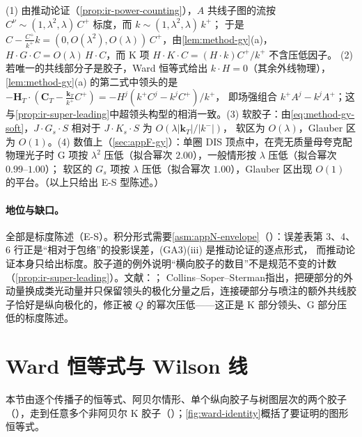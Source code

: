 \begin{proofsketch}
(1) 由推动论证（\cref{prop:ir-power-counting}），$A$ 共线子图的流按 $C^\nu\sim(1,\lambda^2,\lambda)\,C^+$ 标度，而 $k\sim(1,\lambda^2,\lambda)\,k^+$；
于是 $C-\frac{C^+}{k^+}k=(0,O(\lambda^2),O(\lambda))\,C^+$，由\cref{lem:method-gy}(a)，$H\cdot G\cdot C=O(\lambda)\,H\cdot C$，而 K 项 $H\cdot K\cdot C=(H\cdot k)C^+/k^+$ 不含压低因子。
(2) 若唯一的共线部分子是胶子，Ward 恒等式给出 $k\cdot H=0$（其余外线物理），\cref{lem:method-gy}(a) 的第二式中领头的是 $-\mathbf H_T\cdot(\mathbf C_T-\frac{\mathbf k_T}{k^+}C^+)=-H^j(k^+C^j-k^jC^+)/k^+$，
即场强组合 $k^+A^j-k^jA^+$；这与\cref{prop:ir-super-leading}中超领头构型的相消一致。(3) 软胶子：由\cref{eq:method-gy-soft}，$J\cdot G_s\cdot S$ 相对于 $J\cdot K_s\cdot S$ 为 $O(\lambda|\mathbf k_T|/|k^-|)$，
软区为 $O(\lambda)$，Glauber 区为 $O(1)$。(4) 数值上（\cref{sec:appF-gy}）：单圈 DIS 顶点中，在壳无质量母夸克配物理光子时 G 项按 $\lambda^2$ 压低（拟合幂次 $2.00$），一般情形按 $\lambda$ 压低（拟合幂次 $0.99$--$1.00$）；
软区的 $G_s$ 项按 $\lambda$ 压低（拟合幂次 $1.00$），Glauber 区出现 $O(1)$ 的平台。（以上只给出 E-S 型陈述。）
\end{proofsketch}

\paragraph{地位与缺口。}全部是标度陈述（E-S）。积分形式需要\cref{asm:appN-envelope}（\tagA）：误差表第 3、4、6 行正是“相对于包络”的投影误差，(GA3)(iii) 是推动论证的逐点形式，
而推动论证本身只给出标度。胶子道的例外说明“横向胶子的数目”不是规范不变的计数（\cref{prop:ir-super-leading}）。文献：\cite[第~11.3~节]{Collins2011}；
Collins--Soper--Sterman\cite[第~8、9.1~节]{CollinsSoperSterman1989}指出，把硬部分的外动量换成类光动量并只保留领头的极化分量之后，连接硬部分与喷注的额外共线胶子恰好是纵向极化的，修正被 $Q$ 的幂次压低——这正是 K 部分领头、G 部分压低的标度陈述。

\section{Ward 恒等式与 Wilson 线}\label{sec:method-ward}

本节由逐个传播子的恒等式、阿贝尔情形、单个纵向胶子与树图层次的两个胶子（\tagR），走到任意多个非阿贝尔 K 胶子（\tagA）；\cref{fig:ward-identity}概括了要证明的图形恒等式。

